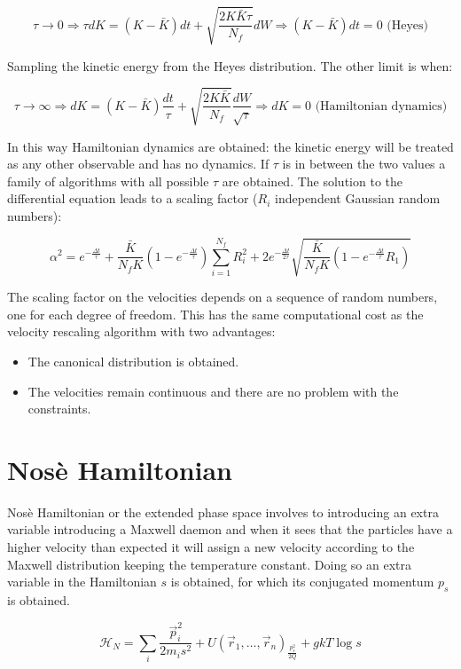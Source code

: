 $$\tau\rightarrow 0\Rightarrow \tau dK = (K-\bar{K})dt + \sqrt{\frac{2K\bar{K}\tau}{N_f}}dW\Rightarrow (K-\bar{K})dt = 0 \text{ (Heyes)}$$

Sampling the kinetic energy from the Heyes distribution.
The other limit is when:

$$\tau\rightarrow\infty\Rightarrow dK = (K-\bar{K})\frac{dt}{\tau} + \sqrt{\frac{2K\bar{K}}{N_f}}\frac{dW}{\sqrt{\tau}}\Rightarrow dK = 0\text{ (Hamiltonian dynamics)}$$

In this way Hamiltonian dynamics are obtained: the kinetic energy will be treated as any other observable and has no dynamics.
If $\tau$ is in between the two values a family of algorithms with all possible $\tau$ are obtained.
The solution to the differential equation leads to a scaling factor ($R_i$ independent Gaussian random numbers):

$$\alpha^2 = e^{-\frac{\Delta t}{\tau}} + \frac{\bar{K}}{N_fK}(1-e^{-\frac{\Delta t}{\tau}})\sum\limits_{i=1}^{N_f}R_i^2+2e^{-\frac{\Delta t}{2\tau}}\sqrt{\frac{\bar{K}}{N_f K}(1-e^{-\frac{\Delta t}{\tau}}R_1)}$$

The scaling factor on the velocities depends on a sequence of random numbers, one for each degree of freedom.
This has the same computational cost as the velocity rescaling algorithm with two advantages:

\begin{multicols}{2}
	\begin{itemize}
		\item The canonical distribution is obtained.
		\item The velocities remain continuous and there are no problem with the constraints.
	\end{itemize}
\end{multicols}

\section{Nos\`e Hamiltonian}
Nos\`e Hamiltonian or the extended phase space involves to introducing an extra variable introducing a Maxwell daemon and when it sees that the particles have a higher velocity than expected it will assign a new velocity according to the Maxwell distribution keeping the temperature constant.
Doing so an extra variable in the Hamiltonian $s$ is obtained, for which its conjugated momentum $p_s$ is obtained.

$$\mathcal{H}_N = \sum\limits_i\frac{\vec{p}_i^2}{2m_is^2} + U(\vec{r}_1, \dots, \vec{r}_n)_ \frac{p_s^2}{2Q}+ gkT\log s$$

